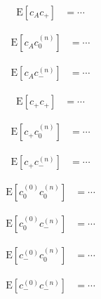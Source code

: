 \documentclass{article}
\begin{document}
\begin{align}
    \mathrm{E}[c_A c_+]
        & = \cdots
\end{align}

\begin{align}
    \mathrm{E}[c_A c_0^{(n)}]
        & = \cdots
\end{align}

\begin{align}
    \mathrm{E}[c_A c_{-}^{(n)}]
        & = \cdots
\end{align}

\begin{align}
    \mathrm{E}[c_+ c_+]
        & = \cdots
\end{align}

\begin{align}
    \mathrm{E}[c_+ c_0^{(n)}]
        & = \cdots
\end{align}

\begin{align}
    \mathrm{E}[c_+ c_{-}^{(n)}]
        & = \cdots
\end{align}

\begin{align}
    \mathrm{E}[c_0^{(0)} c_0^{(n)}]
        & = \cdots
\end{align}

\begin{align}
    \mathrm{E}[c_0^{(0)} c_-^{(n)}]
        & = \cdots
\end{align}

\begin{align}
    \mathrm{E}[c_-^{(0)} c_0^{(n)}]
        & = \cdots
\end{align}

\begin{align}
    \mathrm{E}[c_-^{(0)} c_-^{(n)}]
        & = \cdots
\end{align}

\end{document}
